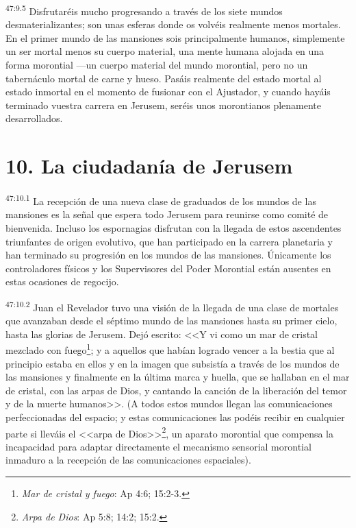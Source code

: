 \par
\textsuperscript{47:9.5} Disfrutaréis mucho progresando a través de los siete mundos desmaterializantes; son unas esferas donde os volvéis realmente menos mortales. En el primer mundo de las mansiones sois principalmente humanos, simplemente un ser mortal menos su cuerpo material, una mente humana alojada en una forma morontial ---un cuerpo material del mundo morontial, pero no un tabernáculo mortal de carne y hueso. Pasáis realmente del estado mortal al estado inmortal en el momento de fusionar con el Ajustador, y cuando hayáis terminado vuestra carrera en Jerusem, seréis unos morontianos plenamente desarrollados.

\section*{10. La ciudadanía de Jerusem}
\par
\textsuperscript{47:10.1} La recepción de una nueva clase de graduados de los mundos de las mansiones es la señal que espera todo Jerusem para reunirse como comité de bienvenida. Incluso los espornagias disfrutan con la llegada de estos ascendentes triunfantes de origen evolutivo, que han participado en la carrera planetaria y han terminado su progresión en los mundos de las mansiones. Únicamente los controladores físicos y los Supervisores del Poder Morontial están ausentes en estas ocasiones de regocijo.

\par
\textsuperscript{47:10.2} Juan el Revelador tuvo una visión de la llegada de una clase de mortales que avanzaban desde el séptimo mundo de las mansiones hasta su primer cielo, hasta las glorias de Jerusem. Dejó escrito: <<Y vi como un mar de cristal mezclado con fuego\footnote{\textit{Mar de cristal y fuego}: Ap 4:6; 15:2-3.}; y a aquellos que habían logrado vencer a la bestia que al principio estaba en ellos y en la imagen que subsistía a través de los mundos de las mansiones y finalmente en la última marca y huella, que se hallaban en el mar de cristal, con las arpas de Dios, y cantando la canción de la liberación del temor y de la muerte humanos>>. (A todos estos mundos llegan las comunicaciones perfeccionadas del espacio; y estas comunicaciones las podéis recibir en cualquier parte si lleváis el <<arpa de Dios>>\footnote{\textit{Arpa de Dios}: Ap 5:8; 14:2; 15:2.}, un aparato morontial que compensa la incapacidad para adaptar directamente el mecanismo sensorial morontial inmaduro a la recepción de las comunicaciones espaciales).

